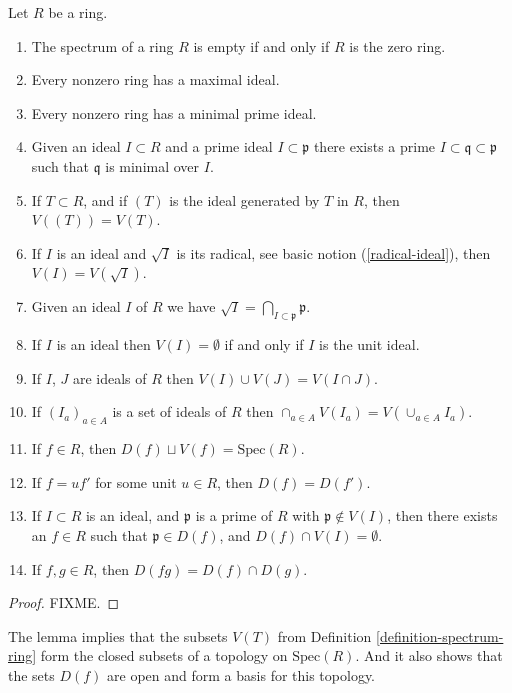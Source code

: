 \begin{lemma}
\label{lemma-Zariski-topology}
Let $R$ be a ring.
\begin{enumerate}
\item The spectrum of a ring $R$ is empty if and only if $R$
is the zero ring.
\item Every nonzero ring has a maximal ideal.
\item Every nonzero ring has a minimal prime ideal.
\item Given an ideal $I \subset R$ and a prime ideal
$I \subset \mathfrak p$ there exists a prime 
$I \subset \mathfrak q \subset \mathfrak p$ such
that $\mathfrak q$ is minimal over $I$.
\item If $T \subset R$, and if $(T)$ is the ideal generated by
$T$ in $R$, then $V((T)) = V(T)$.
\item If $I$ is an ideal and $\sqrt{I}$ is its radical,
see basic notion (\ref{radical-ideal}), then $V(I) = V(\sqrt{I})$.
\item Given an ideal $I$ of $R$ we have $\sqrt{I} =
\bigcap_{I \subset \mathfrak p} \mathfrak p$.
\item If $I$ is an ideal then $V(I) = \emptyset$ if and only
if $I$ is the unit ideal.
\item If $I$, $J$ are ideals of $R$ then $V(I) \cup V(J) =
V(I \cap J)$.
\item If $(I_a)_{a\in A}$ is a set of ideals of $R$ then
$\cap_{a\in A} V(I_a) = V(\cup_{a\in A} I_a)$.
\item If $f \in R$, then $D(f) \sqcup V(f) = \text{Spec}(R)$.
\item If $f = u f'$ for some unit $u \in R$, then $D(f) = D(f')$.
\item If $I \subset R$ is an ideal, and $\mathfrak p$ is a prime of
$R$ with $\mathfrak p \not\in V(I)$, then there exists an $f \in R$
such that $\mathfrak p \in D(f)$, and $D(f) \cap V(I) = \emptyset$.
\item If $f,g \in R$, then $D(fg) = D(f) \cap D(g)$.
\end{enumerate}
\end{lemma}

\begin{proof}
FIXME.
\end{proof}

\noindent
The lemma implies that the subsets $V(T)$ from
Definition \ref{definition-spectrum-ring} form the closed
subsets of a topology on $\text{Spec}(R)$. And it also shows that
the sets $D(f)$ are open and form a basis for this
topology.


